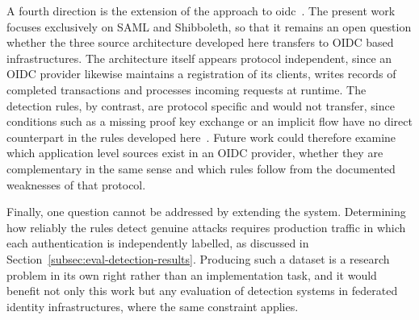 \documentclass[../main.tex]{subfiles}
\begin{document}
A fourth direction is the extension of the approach to \gls{oidc}~\cite{OpenIDConnectCore}. 
The present work focuses exclusively on SAML and Shibboleth, so that it remains an open question 
whether the three source architecture developed here transfers to OIDC based infrastructures. 
The architecture itself appears protocol independent, since an OIDC provider likewise maintains a 
registration of its clients, writes records of completed transactions and processes incoming 
requests at runtime. 
The detection rules, by contrast, are protocol specific and would not transfer, since conditions 
such as a missing proof key exchange or an implicit flow have no direct counterpart in the rules 
developed here~\cite{RFC7636, RFC9700}. 
Future work could therefore examine which application level sources exist in an OIDC provider, 
whether they are complementary in the same sense and which rules follow from the documented 
weaknesses of that protocol. 

Finally, one question cannot be addressed by extending the system. 
Determining how reliably the rules detect genuine attacks requires production traffic in which 
each authentication is independently labelled, as discussed in 
Section~\ref{subsec:eval-detection-results}. 
Producing such a dataset is a research problem in its own right rather than an implementation 
task, and it would benefit not only this work but any evaluation of detection systems in federated 
identity infrastructures, where the same constraint applies. 
\end{document}
